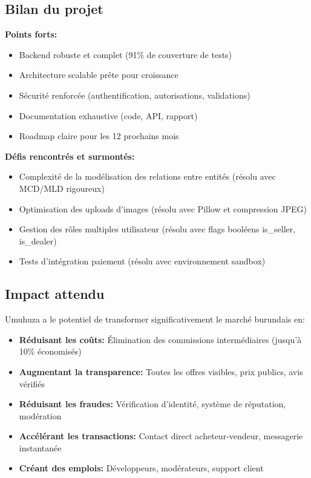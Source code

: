 \subsection{Bilan du projet}

\textbf{Points forts:}
\begin{itemize}
    \item Backend robuste et complet (91\% de couverture de tests)
    \item Architecture scalable prête pour croissance
    \item Sécurité renforcée (authentification, autorisations, validations)
    \item Documentation exhaustive (code, API, rapport)
    \item Roadmap claire pour les 12 prochains mois
\end{itemize}

\textbf{Défis rencontrés et surmontés:}
\begin{itemize}
    \item Complexité de la modélisation des relations entre entités (résolu avec MCD/MLD rigoureux)
    \item Optimisation des uploads d'images (résolu avec Pillow et compression JPEG)
    \item Gestion des rôles multiples utilisateur (résolu avec flags booléens is\_seller, is\_dealer)
    \item Tests d'intégration paiement (résolu avec environnement sandbox)
\end{itemize}

\subsection{Impact attendu}

Umuhuza a le potentiel de transformer significativement le marché burundais en:
\begin{itemize}
    \item \textbf{Réduisant les coûts:} Élimination des commissions intermédiaires (jusqu'à 10\% économisés)
    \item \textbf{Augmentant la transparence:} Toutes les offres visibles, prix publics, avis vérifiés
    \item \textbf{Réduisant les fraudes:} Vérification d'identité, système de réputation, modération
    \item \textbf{Accélérant les transactions:} Contact direct acheteur-vendeur, messagerie instantanée
    \item \textbf{Créant des emplois:} Développeurs, modérateurs, support client
\end{itemize}

